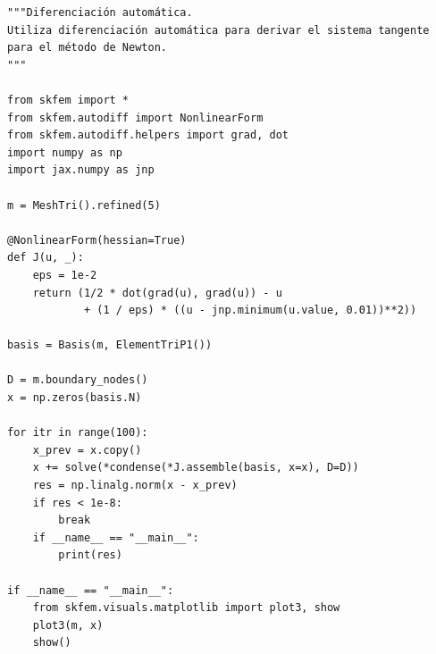 \documentclass[12pt]{book}
\theoremstyle{definition}
\theoremstyle{plain}
\theoremstyle{remark}
\begin{document}
\begin{lstlisting}[caption={Diferenciación automática con scikit-fem.}, label={lst:autodiff-skfem}, style=pythonstyle]
"""Diferenciación automática.
Utiliza diferenciación automática para derivar el sistema tangente
para el método de Newton.
"""

from skfem import *
from skfem.autodiff import NonlinearForm
from skfem.autodiff.helpers import grad, dot
import numpy as np
import jax.numpy as jnp

m = MeshTri().refined(5)

@NonlinearForm(hessian=True)
def J(u, _):
    eps = 1e-2
    return (1/2 * dot(grad(u), grad(u)) - u
            + (1 / eps) * ((u - jnp.minimum(u.value, 0.01))**2))

basis = Basis(m, ElementTriP1())

D = m.boundary_nodes()
x = np.zeros(basis.N)

for itr in range(100):
    x_prev = x.copy()
    x += solve(*condense(*J.assemble(basis, x=x), D=D))
    res = np.linalg.norm(x - x_prev)
    if res < 1e-8:
        break
    if __name__ == "__main__":
        print(res)

if __name__ == "__main__":
    from skfem.visuals.matplotlib import plot3, show
    plot3(m, x)
    show()
\end{lstlisting}








%
%    
\end{document}
